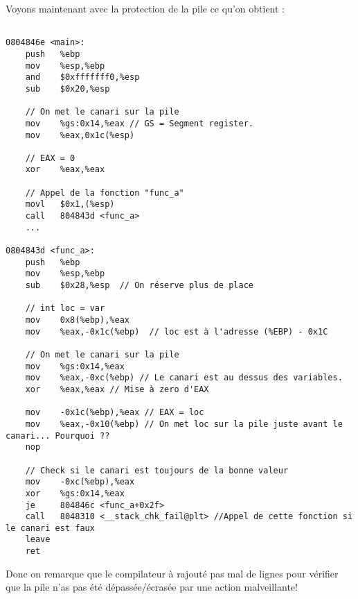 \pagebreak Voyons maintenant avec la protection de la pile ce qu'on obtient :
\begin{lstlisting}[frame=single,style=C]  % Start your code-block

0804846e <main>:
	push   %ebp
	mov    %esp,%ebp
	and    $0xfffffff0,%esp
	sub    $0x20,%esp
	
	// On met le canari sur la pile
	mov    %gs:0x14,%eax // GS = Segment register.
	mov    %eax,0x1c(%esp) 
	
	// EAX = 0
	xor    %eax,%eax
	
	// Appel de la fonction "func_a"
	movl   $0x1,(%esp)
	call   804843d <func_a>
	...
	
0804843d <func_a>:
	push   %ebp
	mov    %esp,%ebp
	sub    $0x28,%esp  // On réserve plus de place
	
	// int loc = var
	mov    0x8(%ebp),%eax
	mov    %eax,-0x1c(%ebp)  // loc est à l'adresse (%EBP) - 0x1C 
	
	// On met le canari sur la pile
	mov    %gs:0x14,%eax  
	mov    %eax,-0xc(%ebp) // Le canari est au dessus des variables. 
	xor    %eax,%eax // Mise à zero d'EAX
	
	mov    -0x1c(%ebp),%eax // EAX = loc 
	mov    %eax,-0x10(%ebp) // On met loc sur la pile juste avant le canari... Pourquoi ??
	nop
	
	// Check si le canari est toujours de la bonne valeur
	mov    -0xc(%ebp),%eax
	xor    %gs:0x14,%eax
	je     804846c <func_a+0x2f>
	call   8048310 <__stack_chk_fail@plt> //Appel de cette fonction si le canari est faux
	leave  
	ret   
\end{lstlisting}

Donc on remarque que le compilateur à rajouté pas mal de lignes pour vérifier que la pile n'as pas été dépassée/écrasée par une action malveillante! 